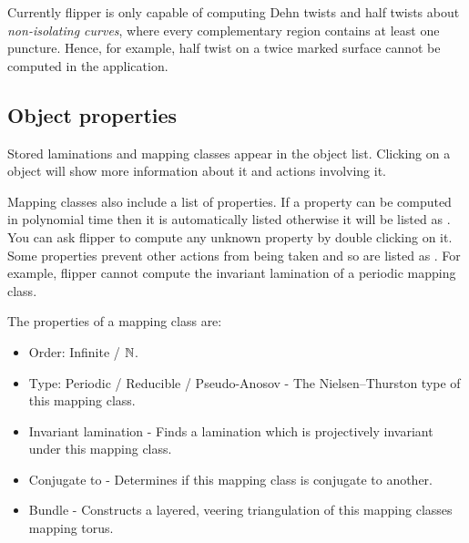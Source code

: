 \documentclass[a4paper]{article}
\newcommand{\exc}[1]{\mbox{\PVerb{#1}}}
\begin{document}
\begin{remark*}
Currently flipper is only capable of computing Dehn twists and half twists about \emph{non-isolating curves}, where every complementary region contains at least one puncture. Hence, for example, half twist on a twice marked surface cannot be computed in the application.
\end{remark*}

\subsection{Object properties}

Stored laminations and mapping classes appear in the object list. Clicking on a object will show more information about it and actions involving it.

Mapping classes also include a list of properties. If a property can be computed in polynomial time then it is automatically listed otherwise it will be listed as \exc{?}. You can ask flipper to compute any unknown property by double clicking on it. Some properties prevent other actions from being taken and so are listed as \exc{x}. For example, flipper cannot compute the invariant lamination of a periodic mapping class.

The properties of a mapping class are:
\begin{itemize}
\item Order: Infinite / $\mathbb{N}$.
\item Type: Periodic / Reducible / Pseudo-Anosov - The Nielsen--Thurston type of this mapping class.
\item Invariant lamination - Finds a lamination which is projectively invariant under this mapping class.
\item Conjugate to - Determines if this mapping class is conjugate to another.
\item Bundle - Constructs a layered, veering triangulation of this mapping classes mapping torus.
\end{itemize}






\end{document}
